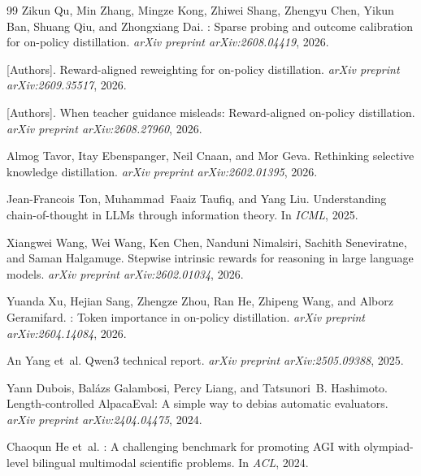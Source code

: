 \documentclass[11pt]{article}
\theoremstyle{definition}
\theoremstyle{remark}
\newcommand{\todo}[1]{\textcolor{red!70!black}{[#1]}}
\begin{document}
\begin{thebibliography}{99}
Zikun Qu, Min Zhang, Mingze Kong, Zhiwei Shang, Zhengyu Chen, Yikun Ban, Shuang Qiu, and Zhongxiang Dai.
: Sparse probing and outcome calibration for on-policy distillation.
\newblock \emph{arXiv preprint arXiv:2608.04419}, 2026.

\todo{Authors}.
\newblock Reward-aligned reweighting for on-policy distillation.
\newblock \emph{arXiv preprint arXiv:2609.35517}, 2026.

\todo{Authors}.
\newblock When teacher guidance misleads: Reward-aligned on-policy distillation.
\newblock \emph{arXiv preprint arXiv:2608.27960}, 2026.

Almog Tavor, Itay Ebenspanger, Neil Cnaan, and Mor Geva.
\newblock Rethinking selective knowledge distillation.
\newblock \emph{arXiv preprint arXiv:2602.01395}, 2026.

Jean-Francois Ton, Muhammad~Faaiz Taufiq, and Yang Liu.
\newblock Understanding chain-of-thought in {LLMs} through information theory.
\newblock In \emph{ICML}, 2025.

Xiangwei Wang, Wei Wang, Ken Chen, Nanduni Nimalsiri, Sachith Seneviratne, and Saman Halgamuge.
\newblock Stepwise intrinsic rewards for reasoning in large language models.
\newblock \emph{arXiv preprint arXiv:2602.01034}, 2026.

Yuanda Xu, Hejian Sang, Zhengze Zhou, Ran He, Zhipeng Wang, and Alborz Geramifard.
: Token importance in on-policy distillation.
\newblock \emph{arXiv preprint arXiv:2604.14084}, 2026.

An Yang et~al.
\newblock Qwen3 technical report.
\newblock \emph{arXiv preprint arXiv:2505.09388}, 2025.


Yann Dubois, Bal\'azs Galambosi, Percy Liang, and Tatsunori~B. Hashimoto.
\newblock Length-controlled {AlpacaEval}: A simple way to debias automatic evaluators.
\newblock \emph{arXiv preprint arXiv:2404.04475}, 2024.

Chaoqun He et~al.
: A challenging benchmark for promoting {AGI} with olympiad-level bilingual multimodal scientific problems.
\newblock In \emph{ACL}, 2024.


\end{thebibliography}
\end{document}
